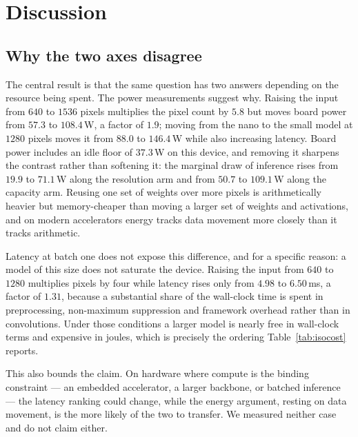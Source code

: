 
\section{Discussion}
\label{sec:discussion}

\subsection{Why the two axes disagree}
\label{sec:discussion:mechanism}

The central result is that the same question has two answers depending on the resource
being spent. The power measurements suggest why. Raising the input from $640$ to $1536$
pixels multiplies the pixel count by $5.8$ but moves board power from $57.3$ to
$108.4$\,W, a factor of $1.9$; moving from the nano to the small model at $1280$ pixels
moves it from $88.0$ to $146.4$\,W while also increasing latency. Board power includes an
idle floor of $37.3$\,W on this device, and removing it sharpens the contrast rather than
softening it: the marginal draw of inference rises from $19.9$ to $71.1$\,W along the
resolution arm and from $50.7$ to $109.1$\,W along the capacity arm. Reusing one set of weights over
more pixels is arithmetically heavier but memory-cheaper than moving a larger set of
weights and activations, and on modern accelerators energy tracks data movement more
closely than it tracks arithmetic.

Latency at batch one does not expose this difference, and for a specific reason: a model of
this size does not saturate the device. Raising the input from $640$ to $1280$ multiplies
pixels by four while latency rises only from $4.98$ to $6.50$\,ms, a factor of $1.31$,
because a substantial share of the wall-clock time is spent in preprocessing, non-maximum
suppression and framework overhead rather than in convolutions. Under those conditions a
larger model is nearly free in wall-clock terms and expensive in joules, which is precisely
the ordering Table~\ref{tab:isocost} reports.

This also bounds the claim. On hardware where compute is the binding constraint --- an
embedded accelerator, a larger backbone, or batched inference --- the latency ranking could
change, while the energy argument, resting on data movement, is the more likely of the two
to transfer. We measured neither case and do not claim either.

